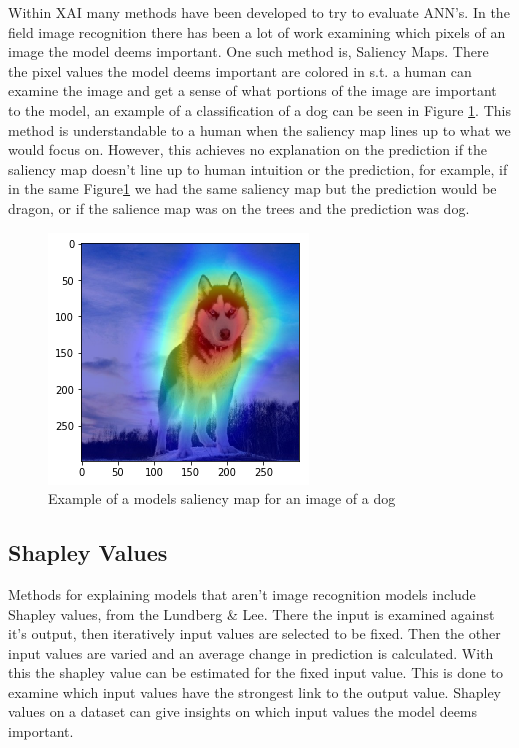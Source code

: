 Within XAI many methods have been developed to try to evaluate
ANN's. In the field image recognition there has been a lot of work examining which
pixels of an image the model deems important. One such method is, Saliency Maps\cite{Koch:saliency}. There the pixel values the model
deems important are colored in s.t. a human can examine the image and get a
sense of what portions of the image are important to the model, an example of
a classification of a dog can be seen in Figure \ref{fig:dog_saliency}. This method is understandable to a human when the saliency map lines up to what we would focus on. However, this achieves no explanation on the prediction if the saliency map doesn't line up to human intuition or the prediction, for example, if in the same Figure\ref{fig:dog_saliency} we had the same saliency map but the prediction would be dragon, or if the salience map was on the trees and the prediction was dog.

\begin{figure}[]
  \centering
  \includegraphics[width=.5\textwidth]{graphics/dog_saliency}
  \caption{Example of a models saliency map for an image of a dog}
  \label{fig:dog_saliency}
\end{figure}

\subsection{Shapley Values}

Methods for explaining models that aren't image recognition models include
Shapley values, from the Lundberg \& Lee\cite{LundbergL:shapley}. There the input is examined against it's output, then iteratively
input values are selected to be fixed. Then the other input values are varied and
an average change in prediction is calculated. With this the shapley value can be
estimated for the fixed input value. This is done to examine which input values have
the strongest link to the output value. Shapley values on a dataset can give insights
on which input values the model deems important.

